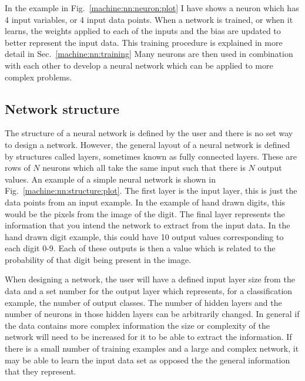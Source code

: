 In the example in Fig.~\ref{machine:nn:neuron:plot} I have shows a neuron which has 4 input variables, or 4 input data points. 
When a network is trained, or when it learns, the weights applied to each of the inputs and the bias are updated to better represent the input data.
This training procedure is explained in more detail in Sec.~\ref{machine:nn:training}
Many neurons are then used in combination with each other to develop a neural network which can be applied to more complex problems.

\subsection{\label{machine:nn:structure}Network structure}

The structure of a neural network is defined by the user and there is no set way to design a network.
However, the general layout of a neural network is defined by structures called layers, sometimes known as fully connected layers. 
These are rows of $N$ neurons which all take the same input such that there is $N$ output values.
An example of a simple neural network is shown in Fig.~\ref{machine:nn:structure:plot}.
The first layer is the input layer, this is just the data points from an input example.
In the example of hand drawn digits, this would be the pixels from the image of the digit.
The final layer represents the information that you intend the network to extract from the input data. 
In the hand drawn digit example, this could have 10 output values corresponding to each digit 0-9. 
Each of these outputs is then a value which is related to the probability of that digit being present in the image.  

When designing a network, the user will have a defined input layer size from the data and a set number for the output layer which represents, for a classification example, the number of output classes. 
The number of hidden layers and the number of neurons in those hidden layers can be arbitrarily changed. 
In general if the data contains more complex information the size or complexity of the network will need to be increased for it to be able to extract the information. 
If there is a small number of training examples and a large and complex network, it may be able to learn the input data set as opposed the the general information that they represent.


